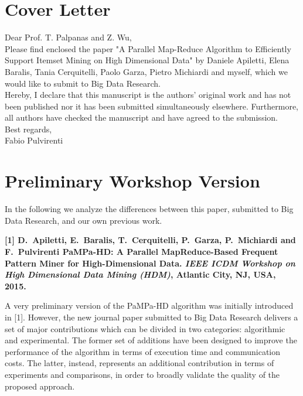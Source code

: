 \documentclass[12pt, onecolumn,letterpaper]{article}
\begin{document}
\section*{Cover Letter}
Dear Prof. T. Palpanas and Z. Wu, \\
Please find enclosed the paper "A Parallel Map-Reduce Algorithm to Efficiently Support Itemset Mining on High Dimensional Data" by Daniele Apiletti, Elena Baralis, Tania
Cerquitelli, Paolo Garza, Pietro Michiardi and myself, which we would like to
submit to Big Data Research.\\

Hereby, I declare that this manuscript is the authors’ original work and has not been published
nor it has been submitted simultaneously elsewhere. Furthermore, all authors have checked the
manuscript and have agreed to the submission.\\

Best regards,\\
Fabio Pulvirenti


\newpage
\section*{Preliminary Workshop Version}

In the following we analyze the differences between this paper, submitted
to Big Data Research, and our own previous work.


\medskip
\noindent
{\bf
[1] D.~Apiletti, E.~Baralis, T.~Cerquitelli, P.~Garza, P.~Michiardi and
F.~Pulvirenti
PaMPa-HD: A Parallel MapReduce-Based Frequent Pattern Miner for High-Dimensional
Data.
{\em IEEE ICDM Workshop on High Dimensional Data Mining (HDM)}, Atlantic City,
  NJ, USA, 2015.
}

\medskip
A very preliminary version of the PaMPa-HD algorithm was initially introduced in
[1].
However, the new journal paper submitted to Big Data Research delivers a set
of major contributions which can be divided in two categories: algorithmic and
experimental.
The former set of additions have been designed to improve the performance of the
algorithm in terms of execution time and communication costs.
The latter, instead, represents an additional contribution in terms of
experiments and comparisons,
in order to broadly validate the quality of the proposed approach.
\end{document}
